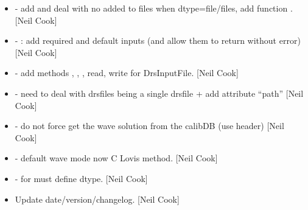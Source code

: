 \documentclass[a4paper,10pt,english]{report}
\begin{document}
\begin{itemize}
\item {} 
 - add  and deal with no 
added to files when dtype=file/files, add function .
{[}Neil Cook{]}

\item {} 
 - : add required and default inputs
(and allow them to return without error) {[}Neil Cook{]}

\item {} 
 - add methods ,
, , read, write for
DrsInputFile. {[}Neil Cook{]}

\item {} 
 - need to deal with drsfiles being a single
drsfile + add attribute “path” {[}Neil Cook{]}

\item {} 
 - do not force get the
wave solution from the calibDB (use header) {[}Neil Cook{]}

\item {} 
 - default wave mode now C
Lovis method. {[}Neil Cook{]}

\item {} 
 - for  must define
dtype. {[}Neil Cook{]}

\item {} 
Update date/version/changelog. {[}Neil Cook{]}

\end{itemize}
\end{document}
